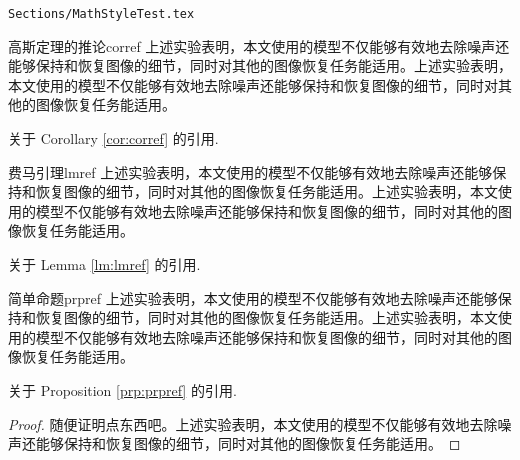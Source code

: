 \begin{frame}{\texttt{Sections/MathStyleTest.tex}}
	\begin{beamercorollary}{高斯定理的推论}{corref}
		上述实验表明，本文使用的模型不仅能够有效地去除噪声还能够保持和恢复图像的细节，同时对其他的图像恢复任务能适用。上述实验表明，本文使用的模型不仅能够有效地去除噪声还能够保持和恢复图像的细节，同时对其他的图像恢复任务能适用。
	\end{beamercorollary}
	关于 Corollary \ref{cor:corref} 的引用.
	
	\begin{beamerlemma}{费马引理}{lmref}
		上述实验表明，本文使用的模型不仅能够有效地去除噪声还能够保持和恢复图像的细节，同时对其他的图像恢复任务能适用。上述实验表明，本文使用的模型不仅能够有效地去除噪声还能够保持和恢复图像的细节，同时对其他的图像恢复任务能适用。
	\end{beamerlemma}
	关于 Lemma \ref{lm:lmref} 的引用.
	
	\begin{beamerproposition}{简单命题}{prpref}
		上述实验表明，本文使用的模型不仅能够有效地去除噪声还能够保持和恢复图像的细节，同时对其他的图像恢复任务能适用。上述实验表明，本文使用的模型不仅能够有效地去除噪声还能够保持和恢复图像的细节，同时对其他的图像恢复任务能适用。
	\end{beamerproposition}
	关于 Proposition \ref{prp:prpref} 的引用.
	
	\begin{proof}
		随便证明点东西吧。上述实验表明，本文使用的模型不仅能够有效地去除噪声还能够保持和恢复图像的细节，同时对其他的图像恢复任务能适用。
	\end{proof}
	
	\vspace*{1cm}
\end{frame}